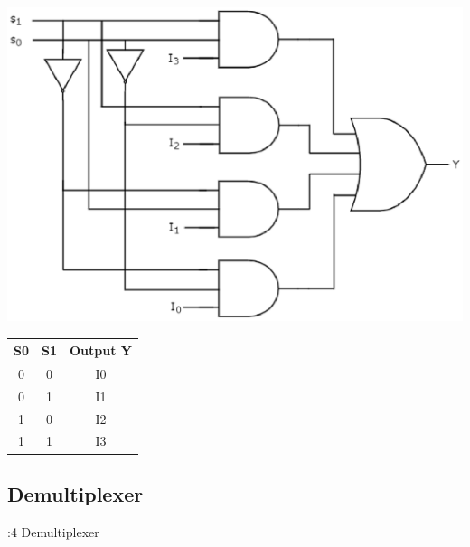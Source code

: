 \documentclass[journal,12pt,twocolumn]{IEEEtran}
\begin{document}
\vspace{0.5cm}
\includegraphics[scale=0.5]{img/41mux}
\begin{table}[h!]
\centering
\begin{tabular}{|cc|c|}
\hline
S0	&	S1	&	Output Y	 \\\hline
0	&	0	&	I0		 	\\\hline
0	&	1	&	I1			\\\hline
1	&	0	&	I2			\\\hline
1	&	1	&	I3			\\\hline

\end{tabular}
\end{table}

\subsection{Demultiplexer}
:4 Demultiplexer
\end{document}
